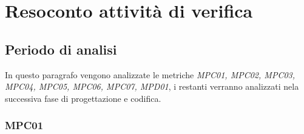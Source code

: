 \section{Resoconto attività di verifica}
\subsection{Periodo di analisi}
In questo paragrafo vengono analizzate le metriche \textit{MPC01, MPC02, MPC03, MPC04, MPC05, MPC06, MPC07, MPD01}, i restanti verranno analizzati nela successiva fase di progettazione e codifica.
\subsubsection{MPC01}